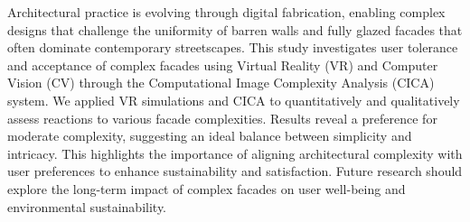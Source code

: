 




Architectural practice is evolving through digital fabrication, enabling complex designs that challenge the uniformity of barren walls and fully glazed facades that often dominate contemporary streetscapes.
This study investigates user tolerance and acceptance of complex facades using Virtual Reality (VR) and Computer Vision (CV) through the Computational Image Complexity Analysis (CICA) system.
We applied VR simulations and CICA to quantitatively and qualitatively assess reactions to various facade complexities.
Results reveal a preference for moderate complexity, suggesting an ideal balance between simplicity and intricacy.
This highlights the importance of aligning architectural complexity with user preferences to enhance sustainability and satisfaction.
Future research should explore the long-term impact of complex facades on user well-being and environmental sustainability.



